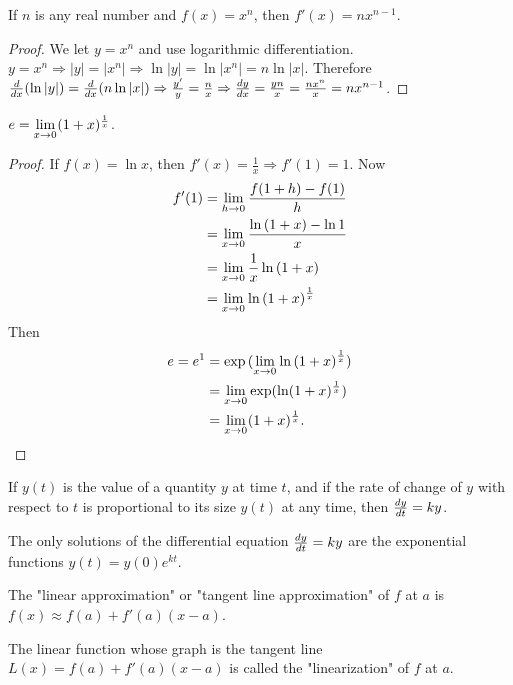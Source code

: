 \documentclass[a4paper,8pt]{article}
\begin{document}
\begin{outline}
    If \(n\) is any real number and \(f(x) = x^n\), then \(f'(x)=nx^{n-1}\).

    \begin{proof}
      We let \(y = x^n\) and use logarithmic differentiation. \(y = x^n \Rightarrow |y| = |x^n| \Rightarrow
      \ln{|y|} = \ln{|x^n|} = n\ln{|x|}\). Therefore \(\leibniz{x}(\ln{|y|}) = \leibniz{x}(n\ln{|x|}) \Rightarrow
      \frac{y'}{y} = \frac{n}{x} \Rightarrow \leibniz[y]{x} = \frac{yn}{x} = \frac{nx^n}{x} = nx^{n-1}\).
    \end{proof}

    \(e = \xlimit{x}{0}(1+x)^{\frac{1}{x}}\).

    \begin{proof}
      If \(f(x) = \ln{x}\), then \(f'(x) = \frac{1}{x} \Rightarrow f'(1) = 1\). Now
      \begin{align*}
        f'(1) &= \xlimit{h}{0}\frac{f(1+h)-f(1)}{h} \\
              &= \xlimit{x}{0}\frac{\ln{(1+x)}-\ln{1}}{x} \\
              &= \xlimit{x}{0}\frac{1}{x}\ln{(1+x)} \\
              &= \xlimit{x}{0} \ln{(1+x)}^{\frac{1}{x}}
      \end{align*}
      Then
      \begin{align*}
        e = e^{1} &= \exp{(\xlimit{x}{0}\ln{(1+x)}^{\frac{1}{x}})} \\
                  &= \xlimit{x}{0} \exp(\ln({1+x})^{\frac{1}{x}}) \\
                  &= \xlimit{x}{0}(1+x)^{\frac{1}{x}}\text{.}
      \end{align*}
    \end{proof}

    If \(y(t)\) is the value of a quantity \(y\) at time \(t\), and if the rate of change of \(y\) with respect
    to \(t\) is proportional to its size \(y(t)\) at any time, then \(\leibniz[y]{t}=ky\).

    The only solutions of the differential equation \(\leibniz[y]{t} = ky\) are the exponential functions
    \(y(t)=y(0)e^{kt}\).

    The "linear approximation" or "tangent line approximation" of \(f\) at \(a\) is \(f(x) \approx f(a) + f'(a)(x-a)\).

    The linear function whose graph is the tangent line \(L(x)=f(a)+f'(a)(x-a)\) is called the "linearization"
    of \(f\) at \(a\).


\end{outline}
\end{document}
